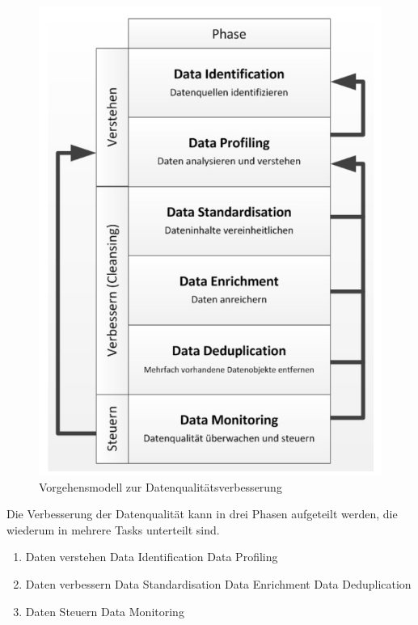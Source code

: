 \documentclass[a4paper, 11pt]{article}
\begin{document}
\begin{figure}
	\centering
	\includegraphics[keepaspectratio=true,height=18\baselineskip]{dataImprovement.PNG}
	\caption{Vorgehensmodell zur Datenqualitätsverbesserung}
\end{figure}

Die Verbesserung der Datenqualität kann in drei Phasen aufgeteilt werden, die wiederum in mehrere Tasks unterteilt sind.

\begin{enumerate}
	\item Daten verstehen
		\subitem Data Identification
		\subitem Data Profiling
	\item Daten verbessern
		\subitem Data Standardisation
		\subitem Data Enrichment
		\subitem Data Deduplication
	\item Daten Steuern
		\subitem Data Monitoring
\end{enumerate}
\end{document}
